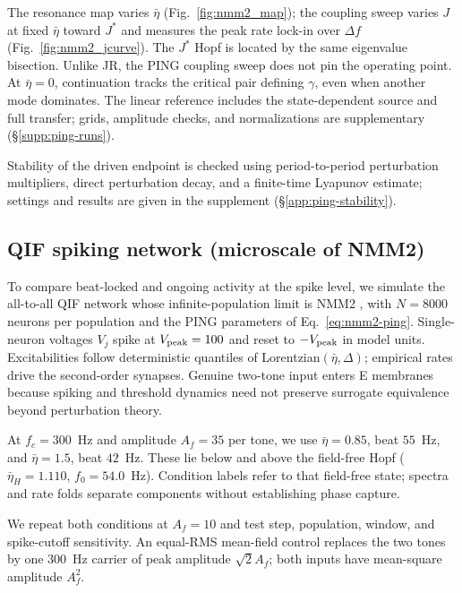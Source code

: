 The resonance map varies $\bar\eta$ (Fig.~\ref{fig:nmm2_map}); the
coupling sweep varies $J$ at fixed $\bar\eta$ toward $J^*$ and measures the
peak rate lock-in over $\Delta f$ (Fig.~\ref{fig:nmm2_jcurve}).
The $J^*$ Hopf is located by the same eigenvalue bisection.
Unlike JR, the PING coupling sweep does not pin the operating point. At
$\bar\eta=0$, continuation tracks the critical pair defining $\gamma$,
even when another mode dominates. The linear reference includes the
state-dependent source and full transfer; grids, amplitude checks, and
normalizations are supplementary (\S\ref{supp:ping-runs}).

\ifjne\else

\fi

Stability of the driven endpoint is checked using period-to-period perturbation
multipliers, direct perturbation decay, and a finite-time Lyapunov estimate;
settings and results are given in the supplement (\S\ref{app:ping-stability}).

\subsection{QIF spiking network (microscale of NMM2)}\label{sec:qif-methods}
To compare beat-locked and ongoing activity at the spike level, we simulate
the all-to-all QIF network whose infinite-population limit is
NMM2 \cite{montbrio2015,ruffini2025rosetta,clusella2023}, with $N=8000$
neurons per population and the PING parameters of Eq.~\eqref{eq:nmm2-ping}.
Single-neuron voltages $V_j$ spike at $V_{\rm peak}=100$ and reset to
$-V_{\rm peak}$ in model units. Excitabilities follow deterministic
quantiles of Lorentzian$(\bar\eta,\Delta)$; empirical rates drive the
second-order synapses. Genuine two-tone input enters E membranes because
spiking and threshold dynamics need not preserve surrogate equivalence
beyond perturbation theory.

At $f_c=300$~Hz and amplitude $A_f=35$ per tone, we use
$\bar\eta=0.85$, beat $55$~Hz, and $\bar\eta=1.5$, beat $42$~Hz.
These lie below and above the field-free Hopf
($\bar\eta_H=1.110$, $f_0=54.0$~Hz). Condition labels refer to that
field-free state; spectra and rate folds separate components without
establishing phase capture.

We repeat both conditions at $A_f=10$ and test step, population, window,
and spike-cutoff sensitivity. An equal-RMS mean-field control replaces the
two tones by one $300$~Hz carrier of peak amplitude $\sqrt2 A_f$;
both inputs have mean-square amplitude $A_f^2$.

